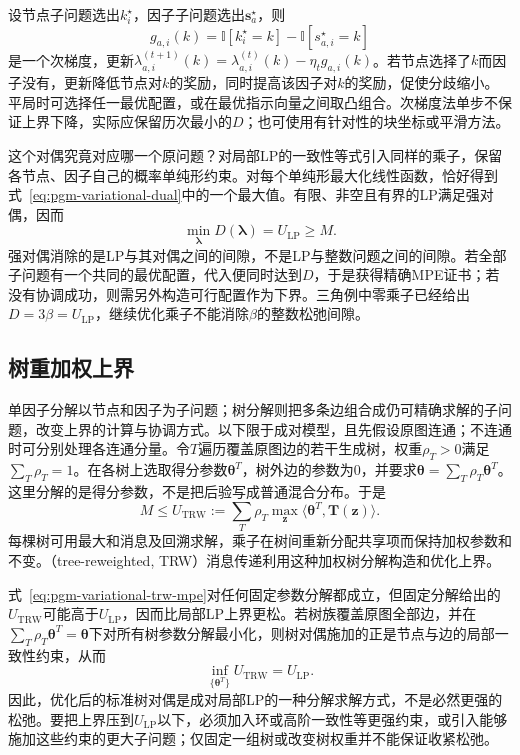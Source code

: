 设节点子问题选出$k_i^\star$，因子子问题选出$\bm s_a^\star$，则
\[
  g_{a,i}(k)=\mathbb I[k_i^\star=k]-\mathbb I[s_{a,i}^\star=k]
\]
是一个次梯度，更新$\lambda_{a,i}^{(t+1)}(k)=\lambda_{a,i}^{(t)}(k)-\eta_t g_{a,i}(k)$。若节点选择了$k$而因子没有，更新降低节点对$k$的奖励，同时提高该因子对$k$的奖励，促使分歧缩小。平局时可选择任一最优配置，或在最优指示向量之间取凸组合。次梯度法单步不保证上界下降，实际应保留历次最小的$D$；也可使用有针对性的块坐标或平滑方法。

这个对偶究竟对应哪一个原问题？对局部LP的一致性等式引入同样的乘子，保留各节点、因子自己的概率单纯形约束。对每个单纯形最大化线性函数，恰好得到式~\eqref{eq:pgm-variational-dual}中的一个最大值。有限、非空且有界的LP满足强对偶，因而
\begin{equation}
  \min_{\bm{\lambda}}D(\bm{\lambda})=U_{\mathrm{LP}}\geq M.
  \label{eq:pgm-variational-dual-lp}
\end{equation}
强对偶消除的是LP与其对偶之间的间隙，不是LP与整数问题之间的间隙。若全部子问题有一个共同的最优配置，代入便同时达到$D$，于是获得精确MPE证书；若没有协调成功，则需另外构造可行配置作为下界。三角例中零乘子已经给出$D=3\beta=U_{\mathrm{LP}}$，继续优化乘子不能消除$\beta$的整数松弛间隙。

\subsection{树重加权上界}
\label{sec:pgm-variational-trw-mpe}

单因子分解以节点和因子为子问题；树分解则把多条边组合成仍可精确求解的子问题，改变上界的计算与协调方式。以下限于成对模型，且先假设原图连通；不连通时可分别处理各连通分量。令$T$遍历覆盖原图边的若干生成树，权重$\rho_T>0$满足$\sum_T\rho_T=1$。在各树上选取得分参数$\bm{\theta}^T$，树外边的参数为$0$，并要求$\bm{\theta}=\sum_T\rho_T\bm{\theta}^T$。这里分解的是得分参数，不是把后验写成普通混合分布。于是
\begin{equation}
  M\leq U_{\mathrm{TRW}}
     :=\sum_T\rho_T\max_{\bm z}
                    \langle\bm{\theta}^T,\bm T(\bm z)\rangle.
  \label{eq:pgm-variational-trw-mpe}
\end{equation}
每棵树可用最大和消息及回溯求解，乘子在树间重新分配共享项而保持加权参数和不变。（tree-reweighted, TRW）消息传递利用这种加权树分解构造和优化上界。

式~\eqref{eq:pgm-variational-trw-mpe}对任何固定参数分解都成立，但固定分解给出的$U_{\mathrm{TRW}}$可能高于$U_{\mathrm{LP}}$，因而比局部LP上界更松。若树族覆盖原图全部边，并在$\sum_T\rho_T\bm{\theta}^T=\bm{\theta}$下对所有树参数分解最小化，则树对偶施加的正是节点与边的局部一致性约束，从而
\[
  \inf_{\{\bm{\theta}^T\}}
     U_{\mathrm{TRW}}=U_{\mathrm{LP}}.
\]
因此，优化后的标准树对偶是成对局部LP的一种分解求解方式，不是必然更强的松弛。要把上界压到$U_{\mathrm{LP}}$以下，必须加入环或高阶一致性等更强约束，或引入能够施加这些约束的更大子问题；仅固定一组树或改变树权重并不能保证收紧松弛。

